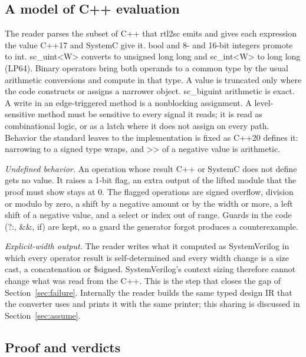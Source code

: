 \documentclass[conference]{IEEEtran}
\newcommand{\code}[1]{{\fontshape{n}\ttfamily #1}}
\begin{document}
\subsection{A model of C++ evaluation}

The reader parses the subset of C++ that \code{rtl2sc} emits and gives each expression the value
C++17 and SystemC give it. \code{bool} and 8- and 16-bit integers promote to \code{int}.
\code{sc\_uint<W>} converts to \code{unsigned long long} and \code{sc\_int<W>} to \code{long long}
(LP64). Binary operators bring both operands to a common type by the usual arithmetic conversions
and compute in that type. A value is truncated only where the code constructs or assigns a
narrower object. \code{sc\_biguint} arithmetic is exact. A \code{write} in an edge-triggered method
is a nonblocking assignment. A level-sensitive method must be sensitive to every signal it reads;
it is read as combinational logic, or as a latch where it does not assign on every path. Behavior
the standard leaves to the implementation is fixed as C++20 defines it: narrowing to a signed type
wraps, and \code{>>} of a negative value is arithmetic.

\emph{Undefined behavior.} An operation whose result C++ or SystemC does not define gets no value.
It raises a 1-bit flag, an extra output of the lifted module that the proof must show stays at 0.
The flagged operations are signed overflow, division or modulo by zero, a shift by a negative
amount or by the width or more, a left shift of a negative value, and a select or index out of
range. Guards in the code (\code{?:}, \code{\&\&}, \code{if}) are kept, so a guard the generator
forgot produces a counterexample.

\emph{Explicit-width output.} The reader writes what it computed as SystemVerilog in which every
operator result is self-determined and every width change is a size cast, a concatenation or
\code{\$signed}. SystemVerilog's context sizing therefore cannot change what was read from the C++.
This is the step that closes the gap of Section~\ref{sec:failure}. Internally the reader builds the
same typed design IR that the converter uses and prints it with the same printer; this sharing is
discussed in Section~\ref{sec:assume}.

\subsection{Proof and verdicts}
\end{document}
